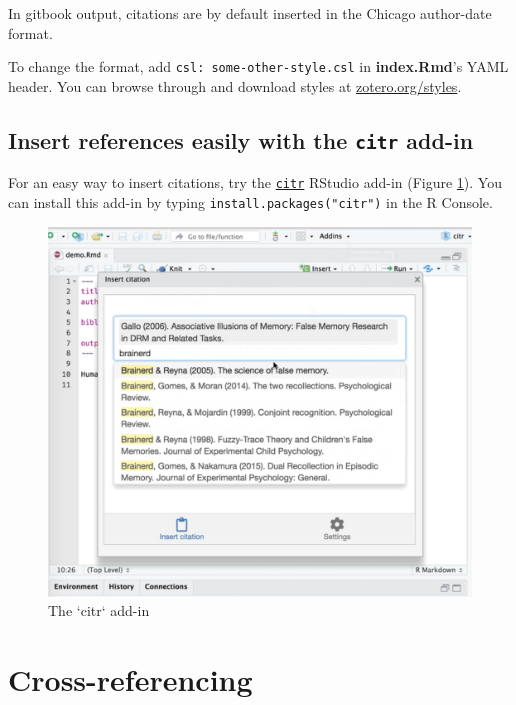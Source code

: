 \documentclass[a4paper, twoside]{templates/ociamthesis}
\begin{document}
In gitbook output, citations are by default inserted in the Chicago author-date format.

To change the format, add \texttt{csl:\ some-other-style.csl} in \textbf{index.Rmd}'s YAML header.
You can browse through and download styles at \href{https://www.zotero.org/styles}{zotero.org/styles}.

\clearpage

\hypertarget{insert-references-easily-with-the-citr-add-in}{%
\subsection{\texorpdfstring{Insert references easily with the \texttt{citr} add-in}{Insert references easily with the citr add-in}}\label{insert-references-easily-with-the-citr-add-in}}

For an easy way to insert citations, try the \href{https://github.com/crsh/citr}{\texttt{citr}} RStudio add-in (Figure \ref{fig:citr}).
You can install this add-in by typing \texttt{install.packages("citr")} in the R Console.

\begin{figure}

{\centering \includegraphics[width=0.8\linewidth]{figures/sample-content/citr} 

}

\caption{The `citr` add-in}\label{fig:citr}
\end{figure}

\hypertarget{cross-referencing}{%
\section{Cross-referencing}\label{cross-referencing}}
\end{document}
